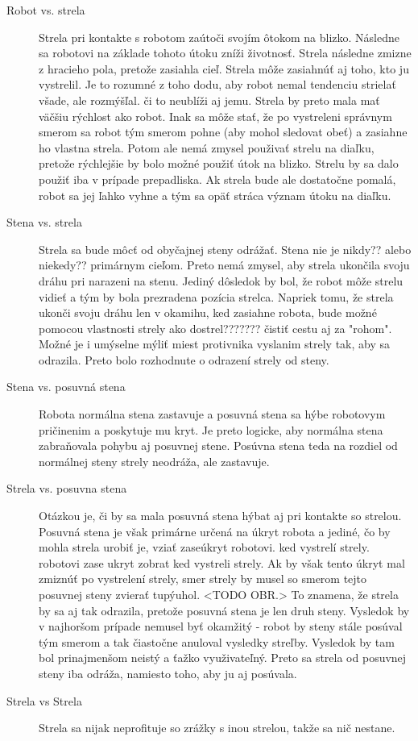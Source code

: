 \begin{description}
\item [Robot vs. strela] Strela pri kontakte s robotom zaútoči svojím ôtokom na blizko. Následne sa robotovi na základe tohoto útoku zníži životnosť. Strela následne zmizne z hracieho pola, pretože zasiahla cieľ. Strela môže zasiahnúť aj toho, kto ju vystrelil. Je to rozumné z toho dodu, aby robot nemal tendenciu strielať všade, ale rozmýšľal.  či to neublíži aj jemu. Strela by preto mala mať väčšiu rýchlost ako robot. Inak sa môže stať, že po vystreleni správnym smerom sa robot tým smerom pohne (aby mohol sledovat obeť)  a zasiahne ho vlastna strela. Potom ale nemá zmysel použivať strelu na diaľku, pretože rýchlejšie by bolo možné použiť útok na blizko. Strelu by sa dalo použiť iba v prípade prepadliska. Ak strela bude ale dostatočne pomalá, robot sa jej ľahko vyhne a tým sa opäť stráca význam útoku na diaľku. %
\item [Stena vs. strela] Strela sa  bude môcť od obyčajnej steny odrážať. Stena nie je nikdy?? alebo niekedy?? primárnym cieľom. Preto nemá zmysel, aby strela ukončila svoju dráhu pri narazeni na stenu. Jediný dôsledok by bol, že robot môže strelu vidieť a tým by bola prezradena pozícia strelca. Napriek tomu, že  strela ukonči svoju dráhu len v okamihu, ked zasiahne robota, bude možné pomocou vlastnosti strely ako dostrel??????? čistiť cestu aj za "rohom". Možné je i  umýselne mýliť  miest protivnika vyslanim strely tak, aby sa odrazila. Preto bolo rozhodnute o odrazení strely od steny.
\item[Stena vs. posuvná stena]  Robota normálna stena zastavuje a posuvná stena sa hýbe robotovym pričinenim a poskytuje mu kryt.  Je preto logicke, aby normálna stena zabraňovala pohybu aj posuvnej stene. Posúvna  stena teda na rozdiel od normálnej steny  strely neodráža, ale zastavuje.
\item[Strela vs. posuvna stena] Otázkou je, či by sa mala posuvná stena  hýbat aj pri kontakte so strelou. Posuvná stena je však primárne určená na úkryt robota a jediné, čo by mohla strela urobiť je,  vziať zaseúkryt robotovi. ked vystrelí strely.             robotovi zase ukryt zobrat ked vystreli strely. Ak by však  tento úkryt mal zmiznúť po vystrelení strely, smer strely by musel so smerom tejto posuvnej steny zvierať  tupýuhol. <TODO OBR.> To znamena, že strela by sa aj tak odrazila, pretože posuvná stena je len druh steny. Vysledok by v najhoršom prípade nemusel byť okamžitý - robot by steny stále posúval tým smerom a tak čiastočne anuloval vysledky streľby. Vysledok  by tam bol prinajmenšom neistý a ťažko využivateľný. Preto sa strela od posuvnej steny iba odráža, namiesto toho, aby ju aj posúvala.
\item [Strela vs Strela] \hfill \newline
Strela sa nijak neprofituje so zrážky s inou strelou, takže sa nič nestane. 
\end{description}
